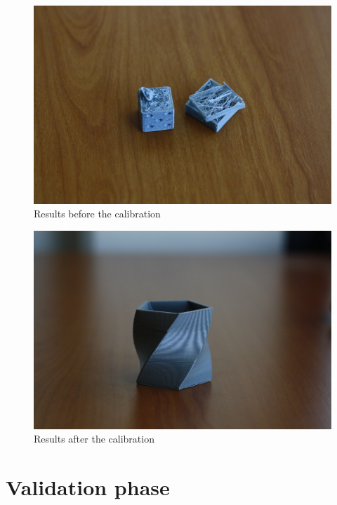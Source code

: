 \documentclass{report}
\begin{document}
\begin{figure}[!h]
\begin{center}
	\includegraphics[width=\textwidth]{uncalibrated_small}
	\caption{Results before the calibration}
\end{center}
\end{figure}
\hfill
\begin{figure}[!h]
\begin{center}
	\includegraphics[width=\textwidth]{calibrated_small}
	\caption{Results after the calibration}
\end{center}
\end{figure}


\bigskip

\chapter{Validation phase}
\end{document}
